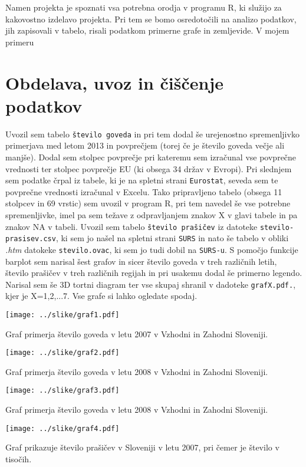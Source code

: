 \documentclass[11pt,a4paper]{article}
\begin{document}
Namen projekta je spoznati vsa potrebna orodja v programu R, ki služijo za kakovostno izdelavo projekta. Pri tem se bomo osredotočili na analizo podatkov, jih zapisovali v tabelo, risali podatkom primerne grafe in zemljevide. V mojem primeru

\pagebreak
\section{Obdelava, uvoz in čiščenje podatkov}
Uvozil sem tabelo \verb|število goveda| in pri tem dodal še urejenostno spremenljivko primerjava med letom 2013 in povprečjem (torej če je število goveda večje ali manjše). Dodal sem stolpec povprečje pri kateremu sem izračunal vse povprečne vrednosti ter stolpec povprečje EU (ki obsega 34 držav v Evropi). Pri slednjem sem podatke črpal iz tabele, ki je na spletni strani \verb|Eurostat|, seveda sem te povprečne vrednosti izračunal v Excelu. Tako pripravljeno tabelo (obsega 11 stolpcev in 69 vrstic) sem uvozil v program R, pri tem navedel še vse potrebne spremenljivke, imel pa sem težave z odpravljanjem znakov X v glavi tabele in pa znakov NA v tabeli.
Uvozil sem tabelo \verb|število prašičev| iz datoteke \verb|stevilo-prasisev.csv|, ki sem jo našel na spletni strani \verb|SURS| in nato še tabelo v obliki \textit{.htm} datokeke \verb|stevilo.ovac|, ki sem jo tudi dobil na \verb|SURS-u|.
S pomočjo funkcije barplot sem narisal šest grafov in sicer število goveda v treh različnih letih, število prašičev v treh različnih regijah in pri usakemu dodal še primerno legendo. Narisal sem še 3D tortni diagram ter vse skupaj shranil v dadoteke \verb|grafX.pdf.|, kjer je X={1,2,...7}. Vse grafe si lahko ogledate spodaj.


\texttt{[image: ../slike/graf1.pdf]}

Graf primerja število goveda v letu 2007 v Vzhodni in Zahodni Sloveniji.


\texttt{[image: ../slike/graf2.pdf]}

Graf primerja število goveda v letu 2008 v Vzhodni in Zahodni Sloveniji.

\texttt{[image: ../slike/graf3.pdf]}

Graf primerja število goveda v letu 2008 v Vzhodni in Zahodni Sloveniji.

\texttt{[image: ../slike/graf4.pdf]}

Graf prikazuje število prašičev v Sloveniji v letu 2007, pri čemer je število v tisočih.
\end{document}
